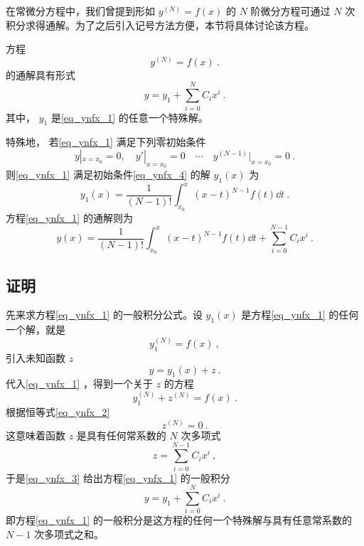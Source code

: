 
在常微分方程中，我们曾提到形如 $y^{(N)}=f(x)$ 的 $N$ 阶微分方程可通过 $N$ 次积分求得通解。为了之后引入记号方法方便，本节将具体讨论该方程。

方程
\begin{equation}\label{eq_ynfx_1}
y^{(N)}=f(x)~.
\end{equation}
的通解具有形式
\begin{equation}\label{eq_ynfx_7}
y=y_1+\sum_{i=0}^{N}C_ix^i~.
\end{equation}
其中， $y_1$ 是\autoref{eq_ynfx_1} 的任意一个特殊解。

特殊地， 若\autoref{eq_ynfx_1} 满足下列零初始条件
\begin{equation}\label{eq_ynfx_4}
y|_{x=x_0}=0,\quad y'|_{x=x_0}=0\quad\cdots \quad y^{(N-1)}|_{x=x_0}=0~.
\end{equation}
则\autoref{eq_ynfx_1} 满足初始条件\autoref{eq_ynfx_4} 的解 $y_1(x)$ 为
\begin{equation}\label{eq_ynfx_5}
y_1(x)=\frac{1}{(N-1)!}\int_{x_0}^x(x-t)^{N-1}f(t)\dd t~.
\end{equation}
方程\autoref{eq_ynfx_1} 的通解则为
\begin{equation}
y(x)=\frac{1}{(N-1)!}\int_{x_0}^x(x-t)^{N-1}f(t)\dd t+\sum_{i=0}^{N-1}C_ix^i~.
\end{equation}
\subsection{证明}
先来求方程\autoref{eq_ynfx_1} 的一般积分公式。设 $y_1(x)$ 是方程\autoref{eq_ynfx_1} 的任何一个解，就是
\begin{equation}\label{eq_ynfx_2}
y_1^{(N)}=f(x)~,
\end{equation}
引入未知函数 $z$
\begin{equation}\label{eq_ynfx_3}
y=y_1(x)+z~.
\end{equation}
代入\autoref{eq_ynfx_1} ，得到一个关于 $z$ 的方程
\begin{equation}
y_1^{(N)}+z^{(N)}=f(x)~.
\end{equation}
根据恒等式\autoref{eq_ynfx_2} 
\begin{equation}
z^{(N)}=0~.
\end{equation}
这意味着函数 $z$ 是具有任何常系数的 $N$ 次多项式
\begin{equation}
z=\sum_{i=0}^{N-1}C_ix^i~,
\end{equation}
于是\autoref{eq_ynfx_3} 给出方程\autoref{eq_ynfx_1} 的一般积分
\begin{equation}
y=y_1+\sum_{i=0}^{N}C_ix^i~.
\end{equation}
即方程\autoref{eq_ynfx_1} 的一般积分是这方程的任何一个特殊解与具有任意常系数的 $N-1$ 次多项式之和。

